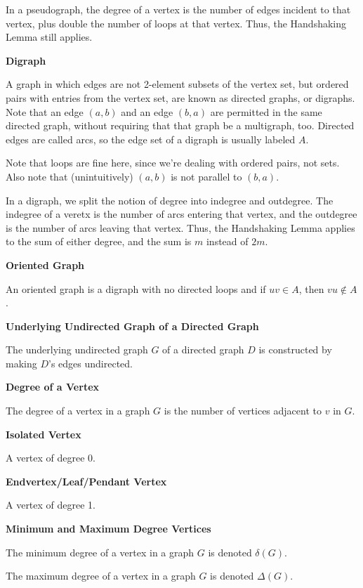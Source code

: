 \documentclass{article}
\begin{document}
    In a pseudograph, the degree of a vertex is the number of edges incident to that vertex, plus double the number of loops at that vertex. Thus, the Handshaking Lemma still applies.

\medskip\noindent\textbf{Digraph}

    A graph in which edges are not 2-element subsets of the vertex set, but ordered pairs with entries from the vertex set, are known as directed graphs, or digraphs. Note that an edge $(a,b)$ and an edge $(b,a)$ are permitted in the same directed graph, without requiring that that graph be a multigraph, too. Directed edges are called arcs, so the edge set of a digraph is usually labeled $A$.

    Note that loops are fine here, since we're dealing with ordered pairs, not sets.
    Also note that (unintuitively) $(a,b)$ is not parallel to $(b,a)$.

    In a digraph, we split the notion of degree into indegree and outdegree. The indegree of a veretx is the number of arcs entering that vertex, and the outdegree is the number of arcs leaving that vertex. Thus, the Handshaking Lemma applies to the sum of either degree, and the sum is $m$ instead of $2m$.

\medskip\noindent\textbf{Oriented Graph}

    An oriented graph is a digraph with no directed loops and if $uv \in A$, then $vu \notin A$.

\medskip\noindent\textbf{Underlying Undirected Graph of a Directed Graph}

    The underlying undirected graph $G$ of a directed graph $D$ is constructed by making $D$'s edges undirected.

\medskip\noindent\textbf{Degree of a Vertex}

    The degree of a vertex in a graph $G$ is the number of vertices adjacent to $v$ in $G$.

\medskip\noindent\textbf{Isolated Vertex}

    A vertex of degree 0.

\medskip\noindent\textbf{Endvertex/Leaf/Pendant Vertex}

    A vertex of degree 1.

\medskip\noindent\textbf{Minimum and Maximum Degree Vertices}

    The minimum degree of a vertex in a graph $G$ is denoted $\delta(G)$.

    The maximum degree of a vertex in a graph $G$ is denoted $\Delta(G)$.
\end{document}
